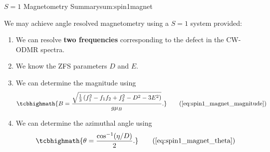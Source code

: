 \begin{summary}{$S=1$ Magnetometry Summary}{sum:spin1magnet}

	We may achieve angle resolved magnetometry using a $S=1$ system provided:
	\begin{enumerate}
        \item We can resolve \textbf{two frequencies} corresponding to the defect in the CW-ODMR spectra.
		\item We know the ZFS parameters $D$ and $E$.

		\item We can determine the magnitude using
		      \begin{equation}
			      \tcbhighmath{B = \frac{\sqrt{\frac{1}{3} \left(f_1^2 - f_1 f_2 + f_2^2 -D^2 -3E^2\right)}}{g \mu_B}.}
			      \tag{\ref{eq:spin1_magnet_magnitude}}
		      \end{equation}
		\item We can determine the azimuthal angle using
		      \begin{equation}
			      \tcbhighmath{
				      \theta = \frac{\cos^{-1} (\eta/D)}{2}.
			      }
			      \tag{\ref{eq:spin1_magnet_theta}}
		      \end{equation}
	\end{enumerate}


\end{summary}
